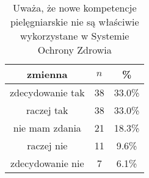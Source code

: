 \begin{table}[H]
\caption{Uważa, że nowe kompetencje pielęgniarskie nie są właściwie wykorzystane w Systemie Ochrony Zdrowia}
\centering
\begin{tabular}{ | c | c | c |}
\hline
zmienna & $n$ & \% \\
\hline
zdecydowanie tak  &  38  & 33.0\% \\
\hline
raczej tak  &  38  & 33.0\% \\
\hline
nie mam zdania  &  21  & 18.3\% \\
\hline
raczej nie  &  11  & 9.6\% \\
\hline
zdecydowanie nie  &  7  & 6.1\% \\
\hline
\end{tabular}
\label{tab:Q21}
\end{table}
